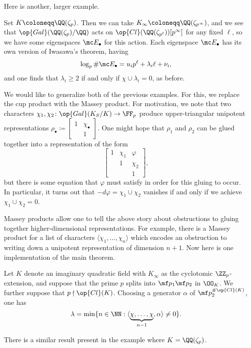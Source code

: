 \documentclass{article}
\begin{document}
Here is another, larger example.
\begin{example}
	Set $K\coloneqq\QQ(\zeta_p)$. Then we can take $K_\infty\coloneqq\QQ(\zeta_{p^\infty})$, and we see that $\op{Gal}(\QQ(\zeta_p)/\QQ)$ acts on $\op{Cl}(\QQ(\zeta_{p^\ell}))[p^\infty]$ for any fixed $\ell$, so we have some eigenspaces $\mc E_\bullet$ for this action. Each eigenspace $\mc E_\bullet$ has its own version of Iwasawa's theorem, having
	\[\log_p\#\mc E_\bullet=u_ip^\ell+\lambda_i\ell+\nu_i,\]
	and one finds that $\lambda_i\ge2$ if and only if $\chi\cup\lambda_i=0$, as before.
\end{example}
We would like to generalize both of the previous examples. For this, we replace the cup product with the Massey product. For motivation, we note that two characters $\chi_1,\chi_2\colon\op{Gal}(K_S/K)\to\FF_p$ produce upper-triangular unipotent representations $\rho_\bullet\coloneqq\begin{bmatrix}
	1 & \chi_\bullet \\ & 1
\end{bmatrix}$. One might hope that $\rho_1$ and $\rho_2$ can be glued together into a representation of the form
\[\begin{bmatrix}
	1 & \chi_1 & \varphi \\
	& 1 & \chi_2 \\
	&& 1
\end{bmatrix},\]
but there is some equation that $\varphi$ must satisfy in order for this gluing to occur. In particular, it turns out that $-d\varphi=\chi_1\cup\chi_2$ vanishes if and only if we achieve $\chi_1\cup\chi_2=0$.

Massey products allow one to tell the above story about obstructions to gluing together higher-dimen\-sional representations. For example, there is a Massey product for a list of characters $\langle\chi_1,\ldots,\chi_n\rangle$ which encodes an obstruction to writing down a unipotent representation of dimension $n+1$. Now here is one implementation of the main theorem.
\begin{corollary}
	Let $K$ denote an imaginary quadratic field with $K_\infty$ as the cyclotomic $\ZZ_p$-extension, and suppose that the prime $p$ splits into $\mf p_1\mf p_2$ in $\OO_K$. We further suppose that $p\nmid\op{Cl}(K)$. Choosing a generator $\alpha$ of $\mf p_2^{\#\op{Cl}(K)}$, one has
	\[\lambda=\min\{n\in\NN:\langle\underbrace{\chi,\ldots,\chi}_{n-1},\alpha\rangle\ne0\}.\]
\end{corollary}
There is a similar result present in the example where $K=\QQ(\zeta_p)$.
\end{document}
